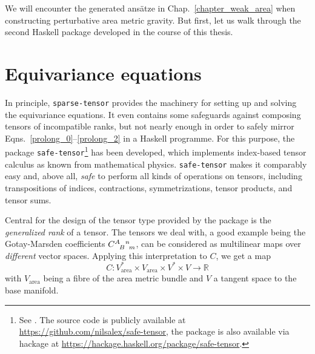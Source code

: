 We will encounter the generated ansätze in Chap.\ \ref{chapter_weak_area} when constructing perturbative area metric gravity. But first, let us walk through the second Haskell package developed in the course of this thesis.

\section{Equivariance equations}
In principle, \texttt{sparse-tensor} provides the machinery for setting up and solving the equivariance equations. It even contains some safeguards against composing tensors of incompatible ranks, but not nearly enough in order to safely mirror Eqns.\ \eqref{prolong_0}--\eqref{prolong_2} in a Haskell programme. For this purpose, the package \texttt{safe-tensor}\footnote{See \cite{Alex_2020_safe-tensor}. The source code is publicly available at \url{https://github.com/nilsalex/safe-tensor}, the package is also available via hackage at \url{https://hackage.haskell.org/package/safe-tensor}.} has been developed, which implements index-based tensor calculus as known from mathematical physics. \texttt{safe-tensor} makes it comparably easy and, above all, \emph{safe} to perform all kinds of operations on tensors, including transpositions of indices, contractions, symmetrizations, tensor products, and tensor sums.

Central for the design of the tensor type provided by the package is the \emph{generalized rank} of a tensor. The tensors we deal with, a good example being the Gotay-Marsden coefficients $\gmc{A}{B}{n}{m}$, can be considered as multilinear maps over \emph{different} vector spaces. Applying this interpretation to $C$, we get a map
\begin{equation}
  C \colon V_\text{area}^\ast \times V_\text{area} \times V^\ast \times V \rightarrow \mathbb R
\end{equation}
with $V_\text{area}$ being a fibre of the area metric bundle and $V$ a tangent space to the base manifold.

